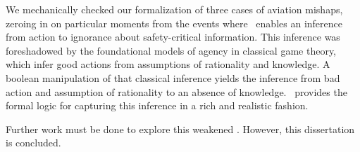 We mechanically checked our formalization of three cases of aviation mishaps, zeroing in on particular moments from the events where \DASL\ enables an inference from action to ignorance about safety-critical information. This inference was foreshadowed by the foundational models of agency in classical game theory, which infer good actions from assumptions of rationality and knowledge. A boolean manipulation of that classical inference yields the inference from bad action and assumption of rationality to an absence of knowledge. \DASL\ provides the formal logic for capturing this inference in a rich and realistic fashion.

Further work must be done to explore this weakened \DASL. However, this dissertation is concluded.